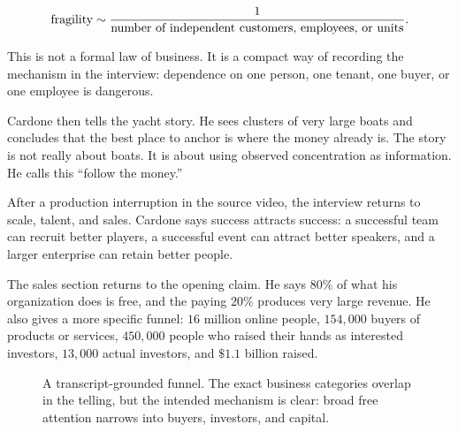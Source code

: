 \[
\hbox{fragility}\sim \frac{1}{\hbox{number of independent customers, employees, or units}}.
\]

This is not a formal law of business. It is a compact way of recording the mechanism in the interview: dependence on one person, one tenant, one buyer, or one employee is dangerous.

Cardone then tells the yacht story. He sees clusters of very large boats and concludes that the best place to anchor is where the money already is. The story is not really about boats. It is about using observed concentration as information. He calls this ``follow the money.''

After a production interruption in the source video, the interview returns to scale, talent, and sales. Cardone says success attracts success: a successful team can recruit better players, a successful event can attract better speakers, and a larger enterprise can retain better people.

The sales section returns to the opening claim. He says \(80\%\) of what his organization does is free, and the paying \(20\%\) produces very large revenue. He also gives a more specific funnel: \(16\) million online people, \(154{,}000\) buyers of products or services, \(450{,}000\) people who raised their hands as interested investors, \(13{,}000\) actual investors, and \(\$1.1\) billion raised.

\begin{figure}
\centering
{}
\caption{A transcript-grounded funnel. The exact business categories overlap in the telling, but the intended mechanism is clear: broad free attention narrows into buyers, investors, and capital.}
\end{figure}

